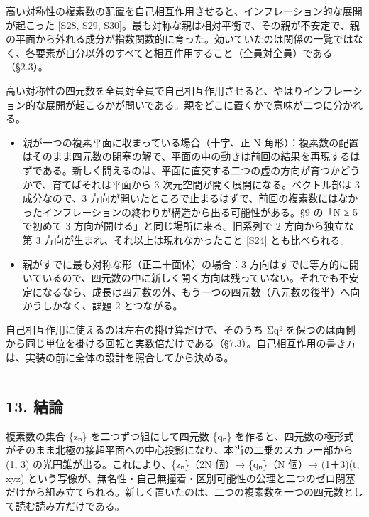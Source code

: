\documentclass[
  a4paper,
]{ltjsarticle}
\providecommand{\tightlist}{%
  \setlength{\itemsep}{0pt}\setlength{\parskip}{0pt}}
\begin{document}
高い対称性の複素数の配置を自己相互作用させると、インフレーション的な展開が起こった
{[}S28, S29,
S30{]}。最も対称な親は相対平衡で、その親が不安定で、親の平面から外れる成分が指数関数的に育った。効いていたのは関係の一覧ではなく、各要素が自分以外のすべてと相互作用すること（全員対全員）である（§2.3）。

高い対称性の四元数を全員対全員で自己相互作用させると、やはりインフレーション的な展開が起こるかが問いである。親をどこに置くかで意味が二つに分かれる。

\begin{itemize}
\tightlist
\item
  親が一つの複素平面に収まっている場合（十字、正 N
  角形）：複素数の配置はそのまま四元数の閉塞の解で、平面の中の動きは前回の結果を再現するはずである。新しく問えるのは、平面に直交する二つの虚の方向が育つかどうかで、育てばそれは平面から
  3 次元空間が開く展開になる。ベクトル部は 3 成分なので、3
  方向が開いたところで止まるはずで、前回の複素数にはなかったインフレーションの終わりが構造から出る可能性がある。§9
  の「N ≥ 5 で初めて 3 方向が開ける」と同じ場所に来る。旧系列で 2
  方向から独立な第 3 方向が生まれ、それ以上は現れなかったこと {[}S24{]}
  とも比べられる。
\item
  親がすでに最も対称な形（正二十面体）の場合：3
  方向はすでに等方的に開いているので、四元数の中に新しく開く方向は残っていない。それでも不安定になるなら、成長は四元数の外、もう一つの四元数（八元数の後半）へ向かうしかなく、課題
  2 とつながる。
\end{itemize}

自己相互作用に使えるのは左右の掛け算だけで、そのうち Σq²
を保つのは両側から同じ単位を掛ける回転と実数倍だけである（§7.3）。自己相互作用の書き方は、実装の前に全体の設計を照合してから決める。

\begin{center}\rule{0.5\linewidth}{0.5pt}\end{center}

\subsection{13. 結論}\label{ux7d50ux8ad6}

複素数の集合 \{zₙ\} を二つずつ組にして四元数 \{qₙ\}
を作ると、四元数の極形式がそのまま北極の接超平面への中心投影になり、本当の二乗のスカラー部から
(1, 3) の光円錐が出る。これにより、\{zₙ\}（2N 個）→ \{qₙ\}（N 個）→
(1＋3)(t, xyz)
という写像が、無名性・自己無撞着・区別可能性の公理と二つのゼロ閉塞だけから組み立てられる。新しく置いたのは、二つの複素数を一つの四元数として読む読み方だけである。
\end{document}
